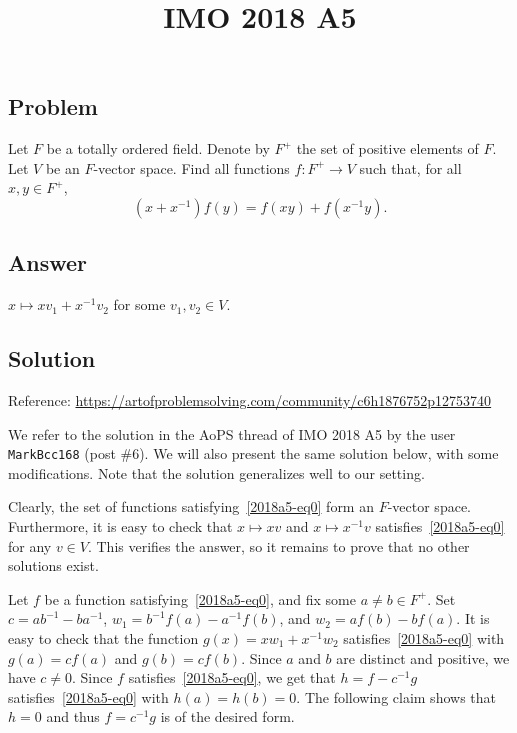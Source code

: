 \documentclass{article}
\title{IMO 2018 A5}
\author{}
\date{}
\begin{document}
\maketitle



\subsection*{Problem}

Let $F$ be a totally ordered field.
Denote by $F^+$ the set of positive elements of $F$.
Let $V$ be an $F$-vector space.
Find all functions $f : F^+ \to V$ such that, for all $x, y \in F^+$,
\[ (x + x^{-1}) f(y) = f(xy) + f(x^{-1} y). \tag{*}\label{2018a5-eq0} \]



\subsection*{Answer}

$x \mapsto x v_1 + x^{-1} v_2$ for some $v_1, v_2 \in V$.



\subsection*{Solution}

Reference: \url{https://artofproblemsolving.com/community/c6h1876752p12753740}

We refer to the solution in the AoPS thread of IMO 2018 A5 by the user \texttt{MarkBcc168} (post \#6).
We will also present the same solution below, with some modifications.
Note that the solution generalizes well to our setting.

Clearly, the set of functions satisfying~\eqref{2018a5-eq0} form an $F$-vector space.
Furthermore, it is easy to check that $x \mapsto xv$ and $x \mapsto x^{-1} v$ satisfies~\eqref{2018a5-eq0} for any $v \in V$.
This verifies the answer, so it remains to prove that no other solutions exist.

Let $f$ be a function satisfying~\eqref{2018a5-eq0}, and fix some $a \neq b \in F^+$.
Set $c = ab^{-1} - ba^{-1}$, $w_1 = b^{-1} f(a) - a^{-1} f(b)$, and $w_2 = a f(b) - b f(a)$.
It is easy to check that the function $g(x) = x w_1 + x^{-1} w_2$ satisfies~\eqref{2018a5-eq0} with $g(a) = cf(a)$ and $g(b) = cf(b)$.
Since $a$ and $b$ are distinct and positive, we have $c \neq 0$.
Since $f$ satisfies~\eqref{2018a5-eq0}, we get that $h = f - c^{-1} g$ satisfies~\eqref{2018a5-eq0} with $h(a) = h(b) = 0$.
The following claim shows that $h = 0$ and thus $f = c^{-1} g$ is of the desired form.
\end{document}
